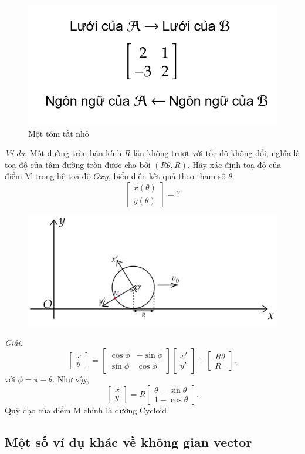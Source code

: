 \begin{figure}[H]
    \centering
    \includegraphics[width=0.4\linewidth]{Tuan2/Figures/final.png}
    \caption{Một tóm tắt nhỏ}
\end{figure}
\emph{Ví dụ}: Một đường tròn bán kính \(R\) lăn không trượt với tốc độ không đổi, nghĩa là toạ độ của tâm đường tròn được cho bởi \((R\theta,R)\). Hãy xác định toạ độ của điểm M trong hệ toạ độ \(Oxy\), biểu diễn kết quả theo tham số \(\theta\).
\[\begin{bmatrix}
    x(\theta)\\y(\theta)
\end{bmatrix}=?\]
\begin{figure}[H]
    \centering
    \includegraphics[width=0.8\linewidth]{Tuan2/Figures/cycloidexample.png}
\end{figure}
\emph{Giải.} 
\[\begin{bmatrix}
    x\\y
\end{bmatrix}=\begin{bmatrix}
    \cos\phi&-\sin\phi \\\sin\phi&\cos\phi
\end{bmatrix}\begin{bmatrix}
    x'\\y'
\end{bmatrix}+\begin{bmatrix}
    R\theta\\R
\end{bmatrix},\] với \(\phi=\pi-\theta.\) Như vậy, 
\[\begin{bmatrix}
    x\\y
\end{bmatrix}=R\begin{bmatrix}
    \theta-\sin\theta\\1-\cos\theta
\end{bmatrix}.\] Quỹ đạo của điểm M chính là đường Cycloid.
\subsection{Một số ví dụ khác về không gian vector}\label{morexample}


